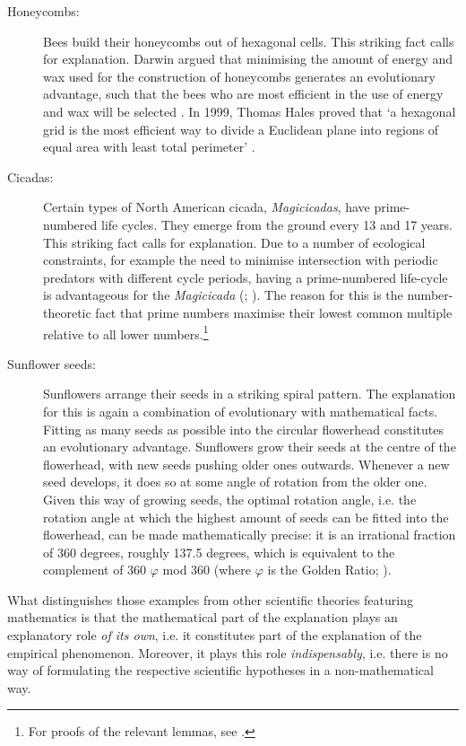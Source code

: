 \documentclass[a4paper,12pt]{article}
\begin{document}
\begin{description}

\item[Honeycombs:] Bees build their honeycombs out of hexagonal cells. This striking fact calls for explanation. Darwin argued that minimising the amount of energy and wax used for the construction of honeycombs generates an evolutionary advantage, such that the bees who are most efficient in the use of energy and wax will be selected \cite{Darwin1859}. In 1999, Thomas Hales proved that `a hexagonal grid is the most efficient way to divide a Euclidean plane into regions of equal area with least total perimeter' \cite[p.~4]{Hales2001}.

\item[Cicadas:] Certain types of North American cicada, \textit{Magicicadas}, have prime-numbered life cycles. They emerge from the ground every 13 and 17 years. This striking fact calls for explanation. Due to a number of ecological constraints, for example the need to minimise intersection with periodic predators with different cycle periods, having a prime-numbered life-cycle is advantageous for the \textit{Magicicada} (\citealp{Baker2005,Baker2009}; \citealp[p.33]{Goles_etal2001}). The reason for this is the number-theoretic fact that prime numbers maximise their lowest common multiple relative to all lower numbers.\footnote{For proofs of the relevant lemmas, see \cite{Landau1958}.}

\item[Sunflower seeds:] Sunflowers arrange their seeds in a striking spiral pattern. The explanation for this is again a combination of evolutionary with mathematical facts. Fitting as many seeds as possible into the circular flowerhead constitutes an evolutionary advantage. Sunflowers grow their seeds at the centre of the flowerhead, with new seeds pushing older ones outwards. Whenever a new seed develops, it does so at some angle of rotation from the older one. Given this way of growing seeds, the optimal rotation angle, i.e. the rotation angle at which the highest amount of seeds can be fitted into the flowerhead, can be made mathematically precise: it is an irrational fraction of 360 degrees, roughly 137.5 degrees, which is equivalent to the complement of 360 $\varphi$ mod 360 (where $\varphi$ is the Golden Ratio; \citealp[p.~4]{Lyon2012}).

\end{description}


What distinguishes those examples from other scientific theories featuring mathematics is that the mathematical part of the explanation plays an explanatory role \textit{of its own}, i.e. it constitutes part of the explanation of the empirical phenomenon. Moreover, it plays this role \textit{indispensably}, i.e. there is no way of formulating the respective scientific hypotheses in a non-mathematical way.
\end{document}

